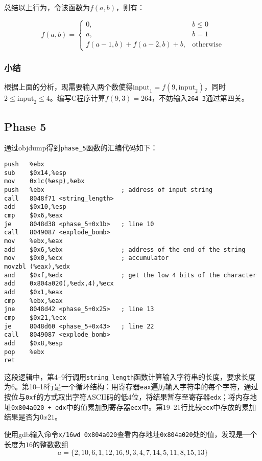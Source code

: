 \documentclass[a4paper, 11pt]{ctexart}
\begin{document}
总结以上行为，令该函数为$f(a, b)$，则有：

\begin{equation*}
    f(a, b) = \begin{cases}
        0, & b \leq 0 \\
        a, & b = 1 \\
        f(a-1, b) + f(a-2, b) + b, & \text{otherwise}
    \end{cases}
\end{equation*}

\subsubsection{小结}
根据上面的分析，现需要输入两个数使得$\text{input}_1 = f(9, \text{input}_2)$，同时$2\le\text{input}_2\le 4$。编写C程序计算$f(9, 3)=264$，不妨输入\texttt{264 3}通过第四关。

\subsection{Phase 5}
通过objdump得到\texttt{phase\_5}函数的汇编代码如下：

\begin{verbatim}
push   %ebx
sub    $0x14,%esp
mov    0x1c(%esp),%ebx
push   %ebx                     ; address of input string
call   8048f71 <string_length>
add    $0x10,%esp
cmp    $0x6,%eax
je     8048d38 <phase_5+0x1b>   ; line 10
call   8049087 <explode_bomb>
mov    %ebx,%eax
add    $0x6,%ebx                ; address of the end of the string
mov    $0x0,%ecx                ; accumulator
movzbl (%eax),%edx
and    $0xf,%edx                ; get the low 4 bits of the character
add    0x804a020(,%edx,4),%ecx
add    $0x1,%eax
cmp    %ebx,%eax
jne    8048d42 <phase_5+0x25>   ; line 13
cmp    $0x21,%ecx
je     8048d60 <phase_5+0x43>   ; line 22
call   8049087 <explode_bomb>
add    $0x8,%esp
pop    %ebx
ret
\end{verbatim}

这段逻辑中，第4--9行调用\texttt{string\_length}函数计算输入字符串的长度，要求长度为$6$。第10--18行是一个循环结构：用寄存器\texttt{eax}遍历输入字符串的每个字符，通过按位与\texttt{0xf}的方式取出字符ASCII码的低4位，将结果暂存至寄存器\texttt{edx}；将内存地址\texttt{0x804a020 + edx}中的值累加到寄存器\texttt{ecx}中。第19--21行比较\texttt{ecx}中存放的累加结果是否为$0x21$。

使用gdb输入命令\texttt{x/16wd 0x804a020}查看内存地址\texttt{0x804a020}处的值，发现是一个长度为$16$的整数数组
\begin{equation*}
a=\{2,10,6,1,12,16,9,3,4,7,14,5,11,8,15,13\}
\end{equation*}
\end{document}
